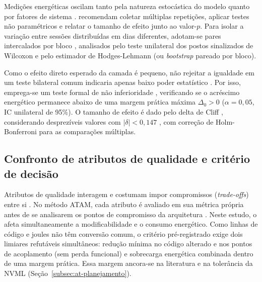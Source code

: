 Medições energéticas oscilam tanto pela natureza estocástica do modelo quanto
por fatores de sistema \cite{ournani2020}.  recomendam
coletar múltiplas repetições, aplicar testes não paramétricos e relatar o
tamanho de efeito junto ao valor-$p$. Para isolar a variação entre sessões
distribuídas em dias diferentes, adotam-se pares intercalados por bloco
\cite{wohlin2024}, analisados pelo teste unilateral dos postos sinalizados de
Wilcoxon \cite{wilcoxon1945} e pelo estimador de Hodges-Lehmann
\cite{hodges1963} (ou \textit{bootstrap} pareado por bloco).

Como o efeito direto esperado da camada é pequeno, não rejeitar a igualdade em
um teste bilateral comum indicaria apenas baixo poder estatístico
\cite{wohlin2024}. Por isso, emprega-se um teste formal de não inferioridade
\cite{wellek2010}, verificando se o acréscimo energético permanece abaixo de uma
margem prática máxima $\Delta_0 > 0$ ($\alpha = 0{,}05$, IC unilateral de 95\%).
O tamanho de efeito é dado pelo delta de Cliff \cite{cliff1993}, considerando
desprezíveis valores com $|\delta| < 0{,}147$ \cite{romano2006}, com correção de
Holm-Bonferroni \cite{holm1979} para as comparações múltiplas.

\subsection{Confronto de atributos de qualidade e critério de decisão}
\label{subsec:exp-criterio}

Atributos de qualidade interagem e costumam impor compromissos
(\textit{trade-offs}) entre si \cite{bass2021}. No método ATAM,
cada atributo é avaliado em sua métrica própria antes de se analisarem os pontos
de compromisso da arquitetura \cite{kazman1998}. Neste estudo, o \harness{} afeta simultaneamente a modificabilidade e o consumo
energético. Como linhas de código e joules não têm conversão comum, o critério
pré-registrado exige dois limiares refutáveis simultâneos: redução mínima no
código alterado e nos pontos de acoplamento (sem perda funcional) e sobrecarga
energética combinada dentro de uma margem prática. Essa margem ancora-se na
literatura \cite{xiao2025,matinpour2026} e na tolerância da NVML
(Seção~\ref{subsec:at-planejamento}).
